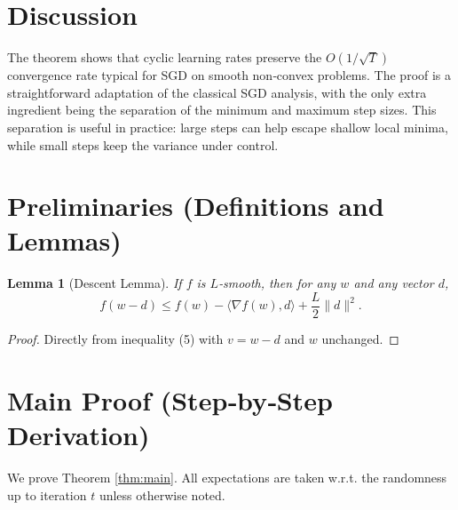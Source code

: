 \documentclass{article}
\newtheorem{lemma}{Lemma}
\begin{document}
\section*{Discussion}
The theorem shows that cyclic learning rates preserve the $O(1/\sqrt{T})$ convergence rate typical for SGD on smooth non‑convex problems. The proof is a straightforward adaptation of the classical SGD analysis, with the only extra ingredient being the separation of the minimum and maximum step sizes. This separation is useful in practice: large steps can help escape shallow local minima, while small steps keep the variance under control.

\section*{Preliminaries (Definitions and Lemmas)}
\begin{lemma}[Descent Lemma]\label{lem:descent}
If $f$ is $L$‑smooth, then for any $w$ and any vector $d$,
\[
f(w-d)\le f(w)-\langle\nabla f(w),d\rangle+\frac{L}{2}\|d\|^2 .
\tag{11}
\]
\end{lemma}
\begin{proof}
Directly from inequality (5) with $v=w-d$ and $w$ unchanged. \qedhere
\end{proof}

\section*{Main Proof (Step‑by‑Step Derivation)}
We prove Theorem \ref{thm:main}. All expectations are taken w.r.t. the randomness up to iteration $t$ unless otherwise noted.
\end{document}
